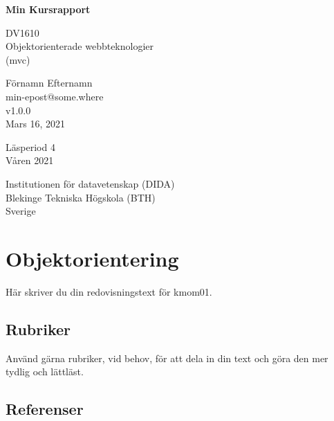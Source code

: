 \documentclass[oneside]{book}
\begin{document}
\begin{titlepage}
    \begin{center}
        \vspace*{1cm}

        \Huge
        \textbf{Min Kursrapport}

        \vspace{0.5cm}
        \LARGE
        DV1610\\
        Objektorienterade webbteknologier\\
        (mvc)

        \vspace{0.5cm}
        \LARGE
        Förnamn Efternamn\\
        min-epost@some.where\\

        \vspace{0.5cm}
        \LARGE
        v1.0.0\\
        Mars 16, 2021

        \vfill

        \vspace{2cm}
        \Large
        Läsperiod 4\\
        Våren 2021

        \vspace{0.5cm}
        \Large
        Institutionen för datavetenskap (DIDA)\\
        Blekinge Tekniska Högskola (BTH)\\
        Sverige

    \end{center}
\end{titlepage}

\tableofcontents



\chapter{Objektorientering}

Här skriver du din redovisningstext för kmom01.

\section{Rubriker}

Använd gärna rubriker, vid behov, för att dela in din text och göra den mer tydlig och lättläst.

\section{Referenser}
\end{document}
